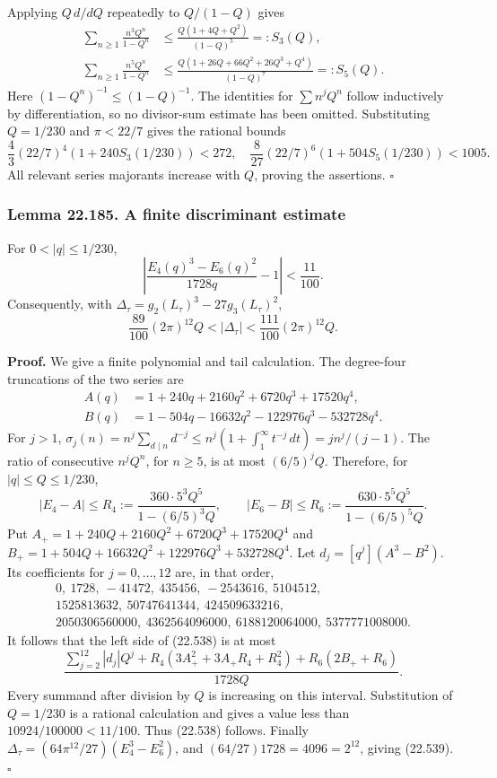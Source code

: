 \documentclass[
  11pt,
  a4paper,
]{article}
\begin{document}
Applying \(Q\,d/dQ\) repeatedly to \(Q/(1-Q)\) gives \[
 \begin{split}
 \sum_{n\ge1}\frac{n^3Q^n}{1-Q^n}
 &\le\frac{Q(1+4Q+Q^2)}{(1-Q)^5}=:S_3(Q),\\
 \sum_{n\ge1}\frac{n^5Q^n}{1-Q^n}
 &\le\frac{Q(1+26Q+66Q^2+26Q^3+Q^4)}{(1-Q)^7}=:S_5(Q).
 \end{split}
 \tag{22.536}
\] Here \((1-Q^n)^{-1}\le(1-Q)^{-1}\). The identities for
\(\sum n^jQ^n\) follow inductively by differentiation, so no divisor-sum
estimate has been omitted. Substituting \(Q=1/230\) and \(\pi<22/7\)
gives the rational bounds \[
 \frac43(22/7)^4(1+240S_3(1/230))<272,\quad
 \frac8{27}(22/7)^6(1+504S_5(1/230))<1005.
 \tag{22.537}
\] All relevant series majorants increase with \(Q\), proving the
assertions. \(\square\)

\subsubsection{Lemma 22.185. A finite discriminant
estimate}\label{lemma-22.185.-a-finite-discriminant-estimate}

For \(0<|q|\le1/230\), \[
 \left|\frac{E_4(q)^3-E_6(q)^2}{1728q}-1\right|<\frac{11}{100}.
 \tag{22.538}
\] Consequently, with \(\Delta_\tau=g_2(L_\tau)^3-27g_3(L_\tau)^2\), \[
 \frac{89}{100}(2\pi)^{12}Q
 <|\Delta_\tau|<\frac{111}{100}(2\pi)^{12}Q.
 \tag{22.539}
\]

\textbf{Proof.} We give a finite polynomial and tail calculation. The
degree-four truncations of the two series are \[
 \begin{split}
 A(q)&=1+240q+2160q^2+6720q^3+17520q^4,\\
 B(q)&=1-504q-16632q^2-122976q^3-532728q^4.
 \end{split}
 \tag{22.540}
\] For \(j>1\), \(\sigma_j(n)=n^j\sum_{d\mid n}d^{-j}
\le n^j(1+\int_1^\infty t^{-j}\,dt)
=j n^j/(j-1)\). The ratio of consecutive \(n^jQ^n\), for \(n\ge5\), is
at most \((6/5)^jQ\). Therefore, for \(|q|\le Q\le1/230\), \[
 |E_4-A|\le R_4:=\frac{360\cdot5^3Q^5}{1-(6/5)^3Q},
 \qquad
 |E_6-B|\le R_6:=\frac{630\cdot5^5Q^5}{1-(6/5)^5Q}.
 \tag{22.541}
\] Put \(A_+=1+240Q+2160Q^2+6720Q^3+17520Q^4\) and
\(B_+=1+504Q+16632Q^2+122976Q^3+532728Q^4\). Let \(d_j=[q^j](A^3-B^2)\).
Its coefficients for \(j=0,\ldots,12\) are, in that order, \[
\begin{gathered}
 0,\ 1728,\ -41472,\ 435456,\ -2543616,\ 5104512,\\
 1525813632,\ 50747641344,\ 424509633216,\\
 2050306560000,\ 4362564096000,\ 6188120064000,\ 5377771008000.
\end{gathered}
\tag{22.542}
\] It follows that the left side of (22.538) is at most \[
 \frac{\sum_{j=2}^{12}|d_j|Q^j
 +R_4(3A_+^2+3A_+R_4+R_4^2)+R_6(2B_++R_6)}{1728Q}.
 \tag{22.543}
\] Every summand after division by \(Q\) is increasing on this interval.
Substitution of \(Q=1/230\) is a rational calculation and gives a value
less than \(10924/100000<11/100\). Thus (22.538) follows. Finally
\(\Delta_\tau=(64\pi^{12}/27)(E_4^3-E_6^2)\), and
\((64/27)1728=4096=2^{12}\), giving (22.539). \(\square\)
\end{document}
